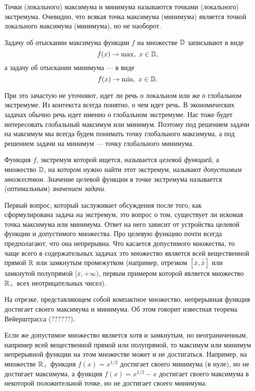      Точки (локального) максимума и минимума называются точками (локального) экстремума.
     Очевидно, что всякая точка максимума (минимума) является точкой
     локального максимума (минимума), но не наоборот.

     Задачу об отыскании максимума функции $f$ на множестве $\mathbb{D}$
     записывают в виде
\begin{equation*}
\label{z-max-odnom}
     f(x)\rightarrow \max, \ x\in\mathbb{D},
\end{equation*}
          а задачу об отыскании минимума --- в виде
\begin{equation}
\label{z-min-odnom}
     f(x)\rightarrow \min, \ x\in\mathbb{D}.
\end{equation}


     При это зачастую не уточняют, идет ли речь о локальном или же
    о глобальном экстремуме. Из
     контекста всегда понятно, о чем идет речь. В экономических
     задачах обычно речь идет именно о глобальном экстремуме. Нас тоже будет
    интересовать глобальный максимум или минимум.
    Поэтому под
     решением задачи на максимум мы всегда будем понимать точку
     глобального максимума, а под решением задачи на минимум ---
     точку глобального минимума.

      Функция $f$,
     экстремум которой ищется, называется \emph{целевой функцией}, а
     множество $\mathbb{D}$, на котором нужно найти этот экстремум,
     называют \emph{допустимым множеством}. Значение целевой функции в точке
    экстремума называется (оптимальным) \emph{значением задачи}.

     Первый вопрос, который заслуживает обсуждения после того, как
     сформулирована задача на экстремум, это вопрос о
     том, существует ли искомая точка максимума или минимума. Ответ
     на него зависит от устройства целевой функции и допустимого
     множества. Про целевую функцию почти всегда предполагают, что
     она непрерывна. Что касается допустимого множества, то чаще
     всего в содержательных задачах это множество является всей
     вещественной прямой $\mathbb{R}$ или замкнутым промежутком (например,
     отрезком $[\bar{x},\bar{\bar{x}}]$ или замкнутой полупрямой
     $[\bar{x},+\infty)$,
     первым примером которой является множество $\mathbb{R}_{+}$ всех
     неотрицательных чисел).

    На отрезке, представляющем собой компактное множество,
    непрерывная функция достигает своего максимума и минимума. Об
    этом говорит известная теорема Вейерштрасса (??????).

    Если же допустимое
    множество является хотя и замкнутым, но неограниченным, например всей вещественной
    прямой или полупрямой, то максимум или минимум непрерывной
    функции на этом множестве может и не достигаться. Например, на
    множестве $\mathbb{R}_{+}$ функция $f(x)=x^{1/2}$ достигает своего
    минимума (в нуле), но не достигает максимума, а функция
    $f(x)=x^{1/2}-x$ достигает своего максимума в некоторой положительной
    точке, но не достигает своего минимума.







